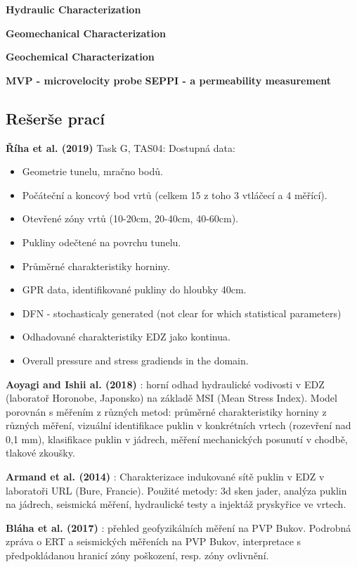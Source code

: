 \documentclass{article}
\begin{document}
{\bf  Hydraulic Characterization} \cite{Lanyon2011}

{\bf  Geomechanical Characterization} \cite{Lanyon2011}

{\bf  Geochemical Characterization} \cite{Lanyon2011}

{\bf MVP - microvelocity probe} \cite{Rutqvist2009} 
{\bf SEPPI - a permeability measurement} \cite{Rutqvist2009} 


\subsection{Rešerše prací}

{\bf Říha et al. (2019)} Task G, TAS04: Dostupná data: 
\begin{itemize}
    \item Geometrie tunelu, mračno bodů.
    \item Počáteční a koncový bod vrtů (celkem 15 z toho 3 vtláčecí a 4 měřící).
    \item Otevřené zóny vrtů (10-20cm, 20-40cm, 40-60cm).
    \item Pukliny odečtené na povrchu tunelu.
    \item Průměrné charakteristiky horniny.
    \item GPR data, identifikované pukliny do hloubky 40cm.
    \item DFN - stochasticaly generated (not clear for which statistical parameters)
    \item Odhadované charakteristiky EDZ jako kontinua.
    \item Overall pressure and stress gradiends in the domain.
\end{itemize}

{\bf Aoyagi and Ishii al. (2018)} \cite{Aoyagi2018}: horní odhad hydraulické vodivosti v EDZ (laboratoř Horonobe, Japonsko) na základě MSI (Mean Stress Index). Model porovnán s měřením z různých metod: průměrné charakteristiky horniny z různých měření, vizuální identifikace puklin v konkrétních vrtech (rozevření nad 0,1 mm), klasifikace puklin v jádrech, měření mechanických posunutí v chodbě, tlakové zkoušky.

{\bf Armand et al. (2014)} \cite{Armand2014}: Charakterizace indukované sítě puklin v EDZ v laboratoři URL (Bure, Francie). Použité metody: 3d sken jader, analýza puklin na jádrech, seismická měření, hydraulické testy a injektáž pryskyřice ve vrtech. 

{\bf Bláha et al. (2017)} \cite{SURAO_184/2014}: přehled geofyzikálních měření na PVP Bukov.
Podrobná zpráva o ERT a seismických měřeních na PVP Bukov, interpretace s předpokládanou hranicí zóny poškození, resp. zóny ovlivnění.  
\end{document}
